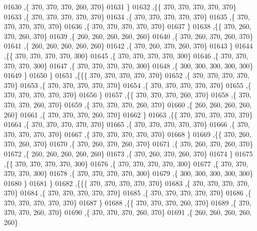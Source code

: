 \begin{DoxyCode}
01630    ,\{   370,   370,   370,   260,   370\}
01631    \}
01632   ,\{\{   370,   370,   370,   370,   370\}
01633    ,\{   370,   370,   370,   370,   370\}
01634    ,\{   370,   370,   370,   370,   370\}
01635    ,\{   370,   370,   370,   370,   370\}
01636    ,\{   370,   370,   370,   370,   370\}
01637    \}
01638   ,\{\{   370,   260,   370,   260,   370\}
01639    ,\{   260,   260,   260,   260,   260\}
01640    ,\{   370,   260,   370,   260,   370\}
01641    ,\{   260,   260,   260,   260,   260\}
01642    ,\{   370,   260,   370,   260,   370\}
01643    \}
01644   ,\{\{   370,   370,   370,   370,   300\}
01645    ,\{   370,   370,   370,   370,   300\}
01646    ,\{   370,   370,   370,   370,   300\}
01647    ,\{   370,   370,   370,   370,   300\}
01648    ,\{   300,   300,   300,   300,   300\}
01649    \}
01650   \}
01651  ,\{\{\{   370,   370,   370,   370,   370\}
01652    ,\{   370,   370,   370,   370,   370\}
01653    ,\{   370,   370,   370,   370,   370\}
01654    ,\{   370,   370,   370,   370,   370\}
01655    ,\{   370,   370,   370,   370,   370\}
01656    \}
01657   ,\{\{   370,   370,   370,   260,   370\}
01658    ,\{   370,   370,   370,   260,   370\}
01659    ,\{   370,   370,   370,   260,   370\}
01660    ,\{   260,   260,   260,   260,   260\}
01661    ,\{   370,   370,   370,   260,   370\}
01662    \}
01663   ,\{\{   370,   370,   370,   370,   370\}
01664    ,\{   370,   370,   370,   370,   370\}
01665    ,\{   370,   370,   370,   370,   370\}
01666    ,\{   370,   370,   370,   370,   370\}
01667    ,\{   370,   370,   370,   370,   370\}
01668    \}
01669   ,\{\{   370,   260,   370,   260,   370\}
01670    ,\{   370,   260,   370,   260,   370\}
01671    ,\{   370,   260,   370,   260,   370\}
01672    ,\{   260,   260,   260,   260,   260\}
01673    ,\{   370,   260,   370,   260,   370\}
01674    \}
01675   ,\{\{   370,   370,   370,   370,   300\}
01676    ,\{   370,   370,   370,   370,   300\}
01677    ,\{   370,   370,   370,   370,   300\}
01678    ,\{   370,   370,   370,   370,   300\}
01679    ,\{   300,   300,   300,   300,   300\}
01680    \}
01681   \}
01682  ,\{\{\{   370,   370,   370,   370,   370\}
01683    ,\{   370,   370,   370,   370,   370\}
01684    ,\{   370,   370,   370,   370,   370\}
01685    ,\{   370,   370,   370,   370,   370\}
01686    ,\{   370,   370,   370,   370,   370\}
01687    \}
01688   ,\{\{   370,   370,   370,   260,   370\}
01689    ,\{   370,   370,   370,   260,   370\}
01690    ,\{   370,   370,   370,   260,   370\}
01691    ,\{   260,   260,   260,   260,   260\}

\end{DoxyCode}
